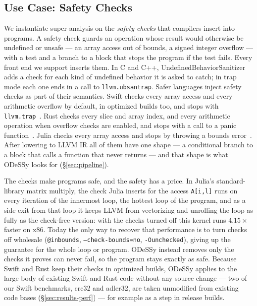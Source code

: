 \documentclass[acmsmall,screen,nonacm]{acmart}
\newcommand{\odessy}{ODeSSy}
\newcommand{\tool}{\odessy}
\begin{document}
\subsection{Use Case: Safety Checks}
\label{sec:target}
We instantiate super-analysis on the \emph{safety checks} that compilers insert into
programs. A safety check guards an operation whose result would
otherwise be undefined or unsafe --- an array access out of bounds, a
signed integer overflow --- with a test and a branch to a block that
stops the program if the test fails. Every front end we support inserts
them. In C and C++, UndefinedBehaviorSanitizer~\cite{ubsanDocs} adds a
check for each kind of undefined behavior it is asked to catch; in trap
mode each one ends in a call to \texttt{llvm.ubsantrap}. Safer languages inject safety checks as part of their semantics. Swift checks
every array access and every arithmetic overflow by default, in
optimized builds too, and stops with \texttt{llvm.trap}~\cite{swiftBook}.
Rust checks every slice and array index, and every arithmetic operation
when overflow checks are enabled, and stops with a call to a panic
function~\cite{rustReference}. Julia checks every array access and stops
by throwing a bounds error~\cite{juliaBoundsCheck}. After lowering to
LLVM IR all of them have one shape --- a conditional branch to a block
that calls a function that never returns --- and that shape is what
\tool{} looks for (\S\ref{sec:pipeline}).


The checks make programs safe, and the safety has a price. In Julia's
standard-library matrix multiply, the check Julia inserts for the
access \texttt{A[i,l]} runs on every iteration of the innermost loop,
the hottest loop of the program, and as a
side exit from that loop it keeps LLVM from vectorizing and unrolling
the loop as fully as the check-free version: with the checks turned off
this kernel runs $4.15\times$ faster on x86. Today the only way to recover that performance
is to turn checks off wholesale (\texttt{@inbounds},
\texttt{--check-bounds=no}, \texttt{-Ounchecked}), giving up the guarantee
for the whole loop or program. \tool{} instead removes only the checks it
proves can never fail, so the program stays exactly as safe. Because
Swift and Rust keep their checks in optimized builds, \tool{} applies
to the large body of existing Swift and Rust code without any source
change --- two of our Swift benchmarks, crc32 and adler32, are taken
unmodified from existing code bases (\S\ref{sec:results-perf}) --- for
example as a step in release builds.
\end{document}
